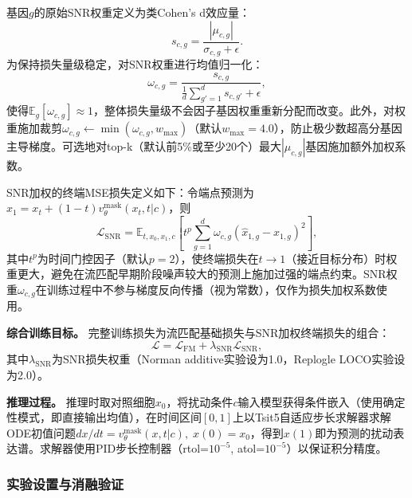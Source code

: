 基因$g$的原始SNR权重定义为类Cohen's d效应量：
\begin{equation}
s_{c,g}=\frac{|\mu_{c,g}|}{\sigma_{c,g}+\epsilon}.
\label{eq:snr_raw}
\end{equation}
为保持损失量级稳定，对SNR权重进行均值归一化：
\begin{equation}
\omega_{c,g}=\frac{s_{c,g}}{\frac{1}{d}\sum_{g'=1}^{d}s_{c,g'}+\epsilon},
\label{eq:snr_norm}
\end{equation}
使得$\mathbb{E}_g[\omega_{c,g}]\approx 1$，整体损失量级不会因子基因权重重新分配而改变。此外，对权重施加裁剪$\omega_{c,g}\leftarrow\min(\omega_{c,g},w_{\max})$（默认$w_{\max}=4.0$），防止极少数超高分基因主导梯度。可选地对top-k（默认前5\%或至少20个）最大$|\mu_{c,g}|$基因施加额外加权系数。

SNR加权的终端MSE损失定义如下：令端点预测为$\hat{x}_1=x_t+(1-t)v_\theta^{\mathrm{mask}}(x_t,t|c)$，则
\begin{equation}
\mathcal{L}_{\mathrm{SNR}}=\mathbb{E}_{t,x_0,x_1,c}\left[t^{p}\sum_{g=1}^{d}\omega_{c,g}\left(\hat{x}_{1,g}-x_{1,g}\right)^2\right],
\label{eq:loss_snr}
\end{equation}
其中$t^{p}$为时间门控因子（默认$p=2$），使终端损失在$t\to 1$（接近目标分布）时权重更大，避免在流匹配早期阶段噪声较大的预测上施加过强的端点约束。SNR权重$\omega_{c,g}$在训练过程中不参与梯度反向传播（视为常数），仅作为损失加权系数使用。

\textbf{综合训练目标。} 完整训练损失为流匹配基础损失与SNR加权终端损失的组合：
\begin{equation}
\mathcal{L}=
\mathcal{L}_{\mathrm{FM}}
+\lambda_{\mathrm{SNR}}\mathcal{L}_{\mathrm{SNR}},
\label{eq:loss_total}
\end{equation}
其中$\lambda_{\mathrm{SNR}}$为SNR损失权重（Norman additive实验设为1.0，Replogle LOCO实验设为2.0）。

\textbf{推理过程。} 推理时取对照细胞$x_0$，将扰动条件$c$输入模型获得条件嵌入（使用确定性模式，即直接输出均值），在时间区间$[0,1]$上以Tsit5自适应步长求解器求解ODE初值问题$dx/dt=v_\theta^{\mathrm{mask}}(x,t|c),\;x(0)=x_0$，得到$x(1)$即为预测的扰动表达谱。求解器使用PID步长控制器（rtol=$10^{-5}$, atol=$10^{-5}$）以保证积分精度。

\subsubsection{实验设置与消融验证}

